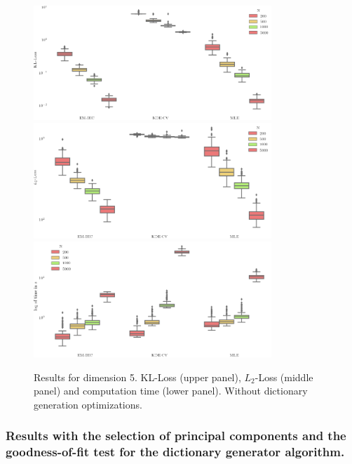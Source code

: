 \begin{figure}
\center
    \includegraphics[width=0.8\textwidth]{./TeX_files/dict_gen_loss_dim_5_KL.png}
    \includegraphics[width=0.8\textwidth]{./TeX_files/dict_gen_loss_dim_5_L2.png}
    \includegraphics[width=0.8\textwidth]{./TeX_files/dict_gen_time_dim_5.png}
    \caption{Results for dimension 5. KL-Loss (upper panel), $L_2$-Loss (middle panel) and computation time (lower panel). Without dictionary generation optimizations.}
    \label{fig:result_dict_gen_dim_5}
\end{figure}
\subsubsection{Results with the selection of principal components and the goodness-of-fit test for the dictionary generator algorithm.}

